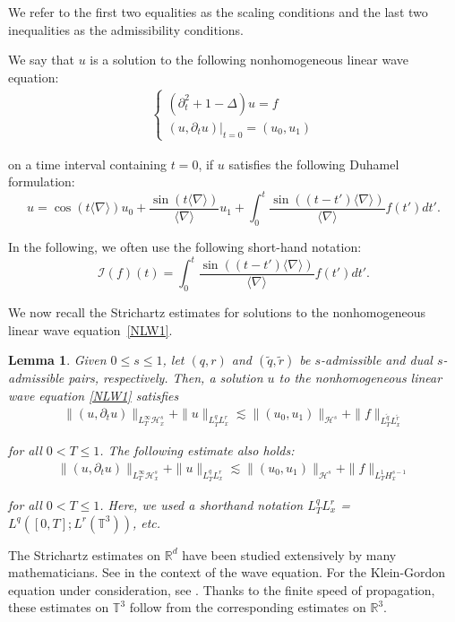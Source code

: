\documentclass[%
11pt,  reqno]{amsart}
\newtheorem{lemma}[theorem]{Lemma}
\newcommand{\1}{\hspace{0.2mm}\text{I}\hspace{0.2mm}}
\newcommand{\noi}{\noindent}
\newcommand{\R}{\mathbb{R}}
\newcommand{\T}{\mathbb{T}}
\newcommand{\nb}{\nabla}
\newcommand{\Dl}{\Delta}
\newcommand{\wt}{\widetilde}
\newcommand{\dt}{\partial_t}
\newcommand{\jb}[1]
{\langle #1 \rangle}
\renewcommand{\H}{\mathcal{H}}
\newcommand{\I}{\mathcal{I}}
\numberwithin{equation}{section}
\numberwithin{theorem}{section}
\begin{document}
\noi
We refer to the first two equalities as the scaling conditions
and the last two inequalities as the admissibility conditions.



We say that  $u$ is a solution to the following nonhomogeneous linear wave equation:
\begin{align}
\begin{cases}
(\dt^2 + 1-\Dl) u = f \\
( u, \dt u) |_{t = 0}=(u_0,  u_1) 
\end{cases}
\label{NLW1}
\end{align}


\noi
on a time interval containing $t= 0$, 
if $u$ satisfies the following Duhamel formulation:
\[ u =  \cos (t\jb{\nb}) u_0 +   \frac{\sin (t\jb{\nb})}{ \jb{\nb}} u_1 
+ \int_0^t  \frac{\sin ((t-t')\jb{\nb})}{ \jb{\nb}}   f(t') dt'. \]  

\noi
In the following, we often use
the following short-hand notation:
\[ \I(f)(t) =  \int_0^t  \frac{\sin ((t-t')\jb{\nb})}{ \jb{\nb}}   f(t') dt'. \]   


\noi
We now recall the  Strichartz estimates
for solutions to the nonhomogeneous linear wave equation~\eqref{NLW1}.



\begin{lemma}\label{LEM:Str}
Given $0 \leq s \leq 1$,
let $(q, r)$ and $(\wt q,\wt r)$
be $s$-admissible and dual $s$-admissible pairs, respectively. 
Then, a solution $u$ to the nonhomogeneous linear wave equation \eqref{NLW1}
satisfies
\begin{align*}
\| (u, \dt u) \|_ {L^\infty_T \H^s_x } + 
 \| u  \|_{L^q_TL^r_x}
\lesssim 
\|(u_0, u_1) \|_{\H^s}  +  \| f \|_{L^{\wt q}_TL^{\wt r}_x}
\end{align*}

\noi
for all $0 < T \leq 1$. 
The following estimate also holds:
\begin{align*}
\| (u, \dt u) \|_ {L^\infty_T \H^s_x } 
+  \| u  \|_{L^q_TL^r_x}
\lesssim 
\|(u_0, u_1) \|_{\H^s}  +  \| f \|_{L^{1}_T H^{s-1}_x}
\end{align*}

\noi
for all $0 < T \leq 1$.
Here, we used a shorthand notation
$L^q_TL^r_x$ = $L^q([0, T]; L^r(\T^3))$, etc.
\end{lemma}


The Strichartz estimates on $\R^d$ have been studied extensively by many
mathematicians.  See \cite{GV, LS, KeelTao}
in the context of the wave equation.
For the Klein-Gordon equation under consideration, 
see \cite{KSV}.
Thanks to the finite speed of propagation, 
these estimates on $\T^3$ follow from the corresponding
estimates on $\R^3$.
\end{document}
